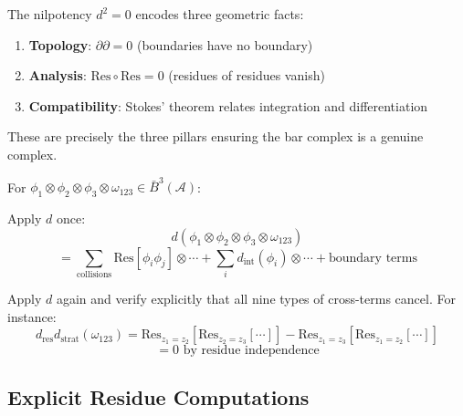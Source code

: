 \begin{remark}
The nilpotency $d^2 = 0$ encodes three geometric facts:
\begin{enumerate}
\item \textbf{Topology}: $\partial \partial = 0$ (boundaries have no boundary)
\item \textbf{Analysis}: $\text{Res}\circ\text{Res} = 0$ (residues of residues vanish)
\item \textbf{Compatibility}: Stokes' theorem relates integration and differentiation
\end{enumerate}
These are precisely the three pillars ensuring the bar complex is a genuine complex.
\end{remark}

\begin{example}
For $\phi_1 \otimes \phi_2 \otimes \phi_3 \otimes \omega_{123} \in \bar{B}^3(\mathcal{A})$:

Apply $d$ once:
$$d(\phi_1 \otimes \phi_2 \otimes \phi_3 \otimes \omega_{123})$$
$$= \sum_{\text{collisions}} \text{Res}[\phi_i \phi_j] \otimes \cdots + 
\sum_i d_{\text{int}}(\phi_i) \otimes \cdots + 
\text{boundary terms}$$

Apply $d$ again and verify explicitly that all nine types of cross-terms cancel. 
For instance:
$$d_{\text{res}} d_{\text{strat}}(\omega_{123}) = 
\text{Res}_{z_1=z_2}[\text{Res}_{z_2=z_3}[\cdots]] - 
\text{Res}_{z_1=z_3}[\text{Res}_{z_1=z_2}[\cdots]]$$
$$= 0 \text{ by residue independence}$$
\end{example}

\subsection{Explicit Residue Computations}

